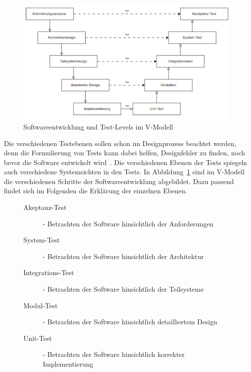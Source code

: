\begin{figure}[h!]
    \centering
    \includegraphics[width=\textwidth,height=\textheight,keepaspectratio]{img/vmodell}
    \caption{Softwareentwicklung und Test-Levels im V-Modell \cite[vgl. Figure 1.2]{software-testing}}
    \label{vmodelltest}
\end{figure}

Die verschiedenen Testebenen sollen schon im Designprozess beachtet werden, denn die Formulierung von Tests kann dabei helfen, Designfehler zu finden,
noch bevor die Software entwickelt wird~\cite[vgl. 1.1.1]{software-testing-ana}.
Die verschiedenen Ebenen der Tests spiegeln auch verschiedene Systemsichten in den Tests.
In Abbildung~\ref{vmodelltest} sind im V-Modell die verschiedenen Schritte der Softwareentwicklung abgebildet.
Dazu passend findet sich im Folgenden die Erklärung der einzelnen Ebenen.

\newpage
\begin{figure}[h!]
    \begin{description}
        \item[Akeptanz-Test] - Betrachten der Software hinsichtlich der Anforderungen
        \item[System-Test] - Betrachten der Software hinsichtlich der Architektur
        \item[Integrations-Test] - Betrachten der Software hinsichtlich der Teilsysteme
        \item[Modul-Test] - Betrachten der Software hinsichtlich detailliertem Design
        \item[Unit-Test] - Betrachten der Software hinsichtlich korrekter Implementierung
    \end{description}\cite[vgl. 1.1.1]{software-testing}
\end{figure}

